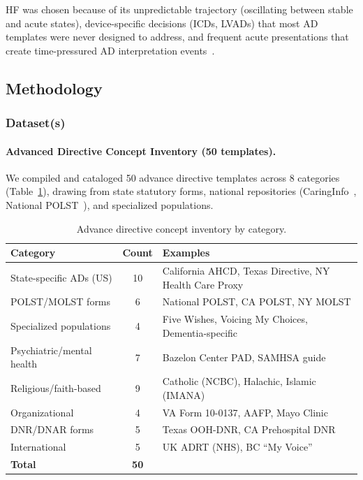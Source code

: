 \documentclass[11pt]{article}
\begin{document}
HF was chosen because of its unpredictable trajectory (oscillating between stable and acute states), device-specific decisions (ICDs, LVADs) that most AD templates were never designed to address, and frequent acute presentations that create time-pressured AD interpretation events~\cite{allen2012}.

\subsection{Methodology}

\subsubsection{Dataset(s)}

\paragraph{Advanced Directive Concept Inventory (50 templates).}
We compiled and cataloged 50 advance directive templates across 8 categories (Table~\ref{tab:inventory}), drawing from state statutory forms, national repositories (CaringInfo~\cite{caringinfo}, National POLST~\cite{polst}), and specialized populations.

\begin{table}[ht]
\centering
\caption{Advance directive concept inventory by category.}
\label{tab:inventory}
\begin{tabularx}{\textwidth}{Xc>{\raggedright\arraybackslash}X}
\toprule
\textbf{Category} & \textbf{Count} & \textbf{Examples} \\
\midrule
State-specific ADs (US) & 10 & California AHCD, Texas Directive, NY Health Care Proxy \\
POLST/MOLST forms & 6 & National POLST, CA POLST, NY MOLST \\
Specialized populations & 4 & Five Wishes, Voicing My Choices, Dementia-specific \\
Psychiatric/mental health & 7 & Bazelon Center PAD, SAMHSA guide \\
Religious/faith-based & 9 & Catholic (NCBC), Halachic, Islamic (IMANA) \\
Organizational & 4 & VA Form 10-0137, AAFP, Mayo Clinic \\
DNR/DNAR forms & 5 & Texas OOH-DNR, CA Prehospital DNR \\
International & 5 & UK ADRT (NHS), BC ``My Voice'' \\
\midrule
\textbf{Total} & \textbf{50} & \\
\bottomrule
\end{tabularx}
\end{table}
\end{document}
